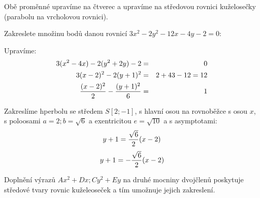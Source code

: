 Obě proměnné upravíme na čtverec a upravíme na středovou rovnici kuželosečky (parabolu na vrcholovou rovnici).

\Pr
Zakreslete množinu bodů danou rovnicí $3x^2-2y^2-12x-4y-2=0$:

Upravíme:
\begin{eqnarray*} 
	3(x^2-4x)-2(y^2+2y)-2&=&0\\
	3(x-2)^2-2(y+1)^2 &=& 2 + 4\*3 - 1 \*2 = 12\\
	\f{(x-2)^2}{2} - \f{(y+1)^2}{6} &=& 1 \\
\end{eqnarray*}

Zakreslíme hperbolu se středem $S[2;-1]$, s hlavní osou na rovnoběžce s osou $x$, s poloosami $a=2;b=\sqrt 6$ a exentricitou $e=\sqrt{10}$ a s asymptotami:
$$y+1 = \frac{\sqrt 6}2(x-2)$$
$$y+1 = -\frac{\sqrt 6}2(x-2)$$

\Poz
Doplnění výrazů $Ax^2+Dx;Cy^2+Ey$ na druhé mocniny dvojčlenů poskytuje středové tvary rovnic kuželeoseček a tím umožnuje jejich zakreslení.

